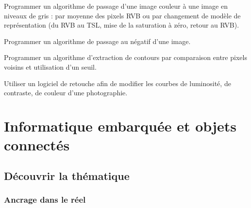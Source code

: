 
\begin{tcolorbox}[title={Ce que propose le programme}, toprule=0pt, leftrule=0pt, rightrule=0pt, arc=0pt,
                  fonttitle=\scshape\boxtitlefont,
                  colbacktitle=white, coltitle=firstcolor, colframe=firstcolor, colback=firstcolor!10,
                  breakable, enhanced jigsaw]
\begin{jazzitemize}
\item Programmer un algorithme de passage d’une image couleur à une image en niveaux de gris : par moyenne des pixels RVB ou par changement de modèle de représentation (du RVB au TSL, mise de la saturation à zéro, retour au RVB).   
\item Programmer un algorithme de passage au négatif d’une image. 
\item Programmer un algorithme d’extraction de contours par comparaison entre pixels voisins et utilisation d’un seuil. 
\item Utiliser un logiciel de retouche afin de modifier les courbes de luminosité, de contraste, de couleur d’une photographie.
\end{jazzitemize}
\end{tcolorbox}


\section[Informatique embarquée\newline et objets connectés]{Informatique embarquée et objets connectés}
\label{sec:VIII.3}


\subsection[Découvrir la thématique]{Découvrir la thématique}
\label{sub:VIII.3.1}


\subsubsection[Ancrage dans le réel]{Ancrage dans le réel}
\label{subsub:VIII.3.1.1}




